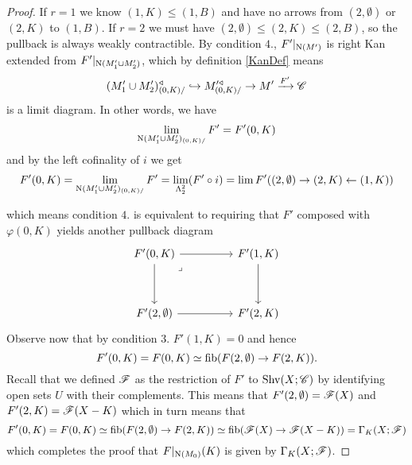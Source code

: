 \documentclass[../../thesis.tex]{subfiles}
\begin{document}
\begin{proof}
    If $r=1$ we know $(1,K) \leq (1,B)$ and have no arrows from $(2,\emptyset)$ or $(2,K)$ to $(1,B)$.
    If $r=2$ we must have $(2,\emptyset) \leq (2,K) \leq (2,B)$, so the pullback is always weakly contractible.
    By condition $4.$, $F'|_{\mathrm{N}(M')}$ is right Kan extended from $F'|_{\mathrm{N}(M_1' \cup M_2')}$, which by definition \ref{KanDef} means
    \[
        (M_1' \cup M_2')^{\triangleleft}_{(0,K)/} \hookrightarrow M'^{\triangleleft}_{(0,K)/}\rightarrow M' \xrightarrow{F'} \mathscr{C}
    \]
    is a limit diagram.
    In other words, we have
    \[
        \lim_{\mathrm{N}(M_1' \cup M_2')_{(0,K)/}}F' = F'(0,K)
    \]
    and by the left cofinality of $i$ we get
    \[
        F'(0,K) = \lim_{\mathrm{N}(M_1' \cup M_2')_{(0,K)/}}F' = \lim_{\Lambda_2^2}(F'\circ i) = \lim F'((2,\emptyset) \rightarrow (2,K) \leftarrow (1,K))
    \]

    which means condition $4.$ is equivalent to requiring that $F'$ composed with $\varphi(0,K)$ yields another pullback diagram
    \[\begin{tikzcd}
            {F'(0,K)} && {F'(1,K)} \\
            \\
            {F'(2,\emptyset)} && {F'(2,K)}
            \arrow[from=1-1, to=1-3]
            \arrow[from=1-3, to=3-3]
            \arrow[from=3-1, to=3-3]
            \arrow[from=1-1, to=3-1]
            \arrow["\lrcorner"{anchor=center, pos=0.125}, draw=none, from=1-1, to=3-3]
        \end{tikzcd}\]
    Observe now that by condition $3.$ $F'(1,K)=0$ and hence
    \[
        F'(0,K)=F(0,K)\simeq \operatorname{fib}(F(2,\emptyset) \to F(2,K)).
    \]
    Recall that we defined $\mathscr{F}$ as the restriction of $F'$ to $\mathrm{Shv}(X;\mathscr{C})$ by identifying open sets $U$ with their complements.
    This means that $F'(2,\emptyset) = \mathscr{F}(X)$ and $F'(2,K) = \mathscr{F}(X-K)$ which in turn means that
    \[
        F'(0,K)=F(0,K)\simeq \operatorname{fib}(F(2,\emptyset) \to F(2,K)) \simeq \operatorname{fib}(\mathscr{F}(X) \to \mathscr{F}(X-K)) = \Gamma_K(X;\mathscr{F})
    \]
    which completes the proof that $F|_{\mathrm{N}(M_0)}(K)$ is given by $\Gamma_K(X;\mathscr{F})$.


\end{proof}
\end{document}

